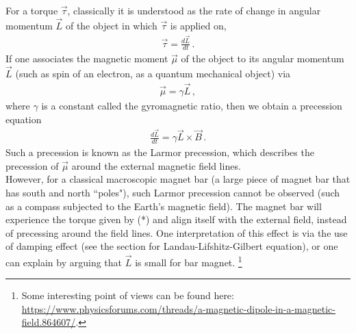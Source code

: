 \documentclass[11pt, onesided]{book}
\theoremstyle{break}
\theoremstyle{break}
\begin{document}
For a torque $\vec{\tau}$, classically it is understood as the rate of change in angular momentum $\vec{L}$ of the object in which $\vec{\tau}$ is applied on, 
\begin{align*}
\vec{\tau} = \frac{d\vec{L}}{dt}\,.
\end{align*}
If one associates the magnetic moment $\vec{\mu}$ of the object to its angular momentum $\vec{L}$ (such as spin of an electron, as a quantum mechanical object) via
\begin{align*}
\vec{\mu} =\gamma\vec{L}\,,
\end{align*}
where $\gamma$ is a constant called the gyromagnetic ratio, then we obtain a precession equation 
\begin{align*}
\frac{d\vec{L}}{dt} = \gamma \vec{L}\times \vec{B}\,.
\end{align*}
Such a precession is known as the Larmor precession, which describes the precession of $\vec{\mu}$ around the external magnetic field lines. \\

However, for a classical macroscopic magnet bar (a large piece of magnet bar that has south and north ``poles"), such Larmor precession cannot be observed (such as a compass subjected to the Earth's magnetic field). The magnet bar will experience the torque given by (*) and align itself with the external field, instead of precessing around the field lines. One interpretation of this effect is via the use of damping effect (see the section for Landau-Lifshitz-Gilbert equation), or one can explain by arguing that $\vec{L}$ is small for bar magnet. \footnote{Some interesting point of views can be found here: \url{https://www.physicsforums.com/threads/a-magnetic-dipole-in-a-magnetic-field.864607/}.}\\
\end{document}
